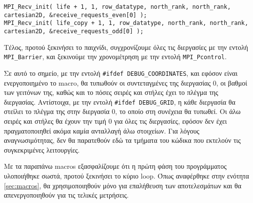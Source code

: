 \begin{tcolorbox}
\begin{verbatim}
MPI_Recv_init( life + 1, 1, row_datatype, north_rank, north_rank, cartesian2D, &receive_requests_even[0] );
MPI_Recv_init( life_copy + 1, 1, row_datatype, north_rank, north_rank, cartesian2D, &receive_requests_odd[0] );
\end{verbatim}
\end{tcolorbox}

Τέλος, προτού ξεκινήσει το παιχνίδι, συγχρονίζουμε όλες τις διεργασίες με την εντολή\\ \texttt{MPI_Barrier}, και ξεκινούμε την χρονομέτρηση με την εντολή \texttt{MPI_Pcontrol}.

\begin{tcolorbox}[fonttitle=\bfseries\large,title=Σημείωση]
Σε αυτό το σημείο, με την εντολή \texttt{#ifdef DEBUG_COORDINATES}, και εφόσον είναι ενεργοποιημένο το macro, θα τυπωθούν οι συντεταγμένες της διεργασίας $0$, οι βαθμοί των γειτόνων της, καθώς και το πόσες σειρές και στήλες έχει το πλέγμα της διεργασίας. Αντίστοιχα, με την εντολή \texttt{#ifdef DEBUG_GRID}, η κάθε διεργασία θα στείλει το πλέγμα της στην διεργασία $0$, το οποίο στη συνέχεια θα τυπωθεί. Οι άλω σειρές και στήλες θα έχουν την τιμή $0$ για όλες τις διεργασίες, εφόσον δεν έχει πραγματοποιηθεί ακόμα καμία ανταλλαγή άλω στοιχείων. Για λόγους αναγνωσιμότητας, δεν θα παρατεθούν εδώ τα τμήματα του κώδικα που εκτελούν τις συγκεκριμένες λειτουργίες. \par
Με τα παραπάνω macros εξασφαλίζουμε ότι η πρώτη φάση του προγράμματος υλοποιήθηκε σωστά, προτού ξεκινήσει το κύριο loop. Όπως αναφέρθηκε στην ενότητα \ref{sec:macros}, θα χρησιμοποιηθούν μόνο για επαλήθευση των αποτελεσμάτων και θα απενεργοποιηθούν για τις τελικές μετρήσεις.
\end{tcolorbox}

